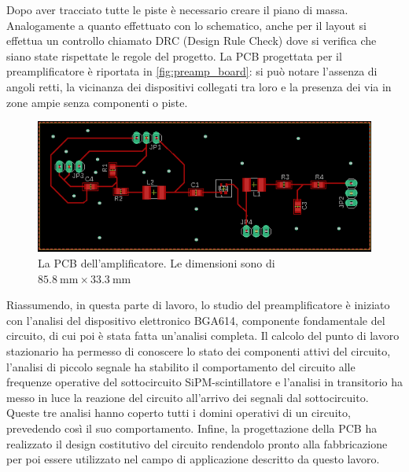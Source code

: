 Dopo aver tracciato tutte le piste è necessario creare il piano di massa. Analogamente a quanto effettuato con lo schematico, anche per il layout
si effettua un controllo chiamato DRC (Design Rule Check) dove si verifica che siano state rispettate le regole del progetto. 
La PCB progettata per il preamplificatore è riportata in \autoref*{fig:preamp_board}: si può notare l'assenza di angoli retti, la vicinanza dei dispositivi collegati
tra loro e la presenza dei via in zone ampie senza componenti o piste.
\begin{figure}[h!]
    \centering
    \includegraphics[width=.65\linewidth]{img/preamp_board.png}
    \caption{La PCB dell'amplificatore. Le dimensioni sono di $\SI{85.8}{\milli\meter} \times \SI{33.3}{\milli\meter}$}
    \label{fig:preamp_board}
\end{figure}

Riassumendo, in questa parte di lavoro, lo studio del preamplificatore è iniziato con l'analisi del dispositivo elettronico BGA614, componente fondamentale del circuito, di cui poi 
è stata fatta un'analisi completa. Il calcolo del punto di lavoro stazionario ha permesso di conoscere lo stato dei componenti attivi del circuito,
l'analisi di piccolo segnale ha stabilito il comportamento del circuito alle frequenze operative del sottocircuito SiPM-scintillatore e l'analisi 
in transitorio ha messo in luce la reazione del circuito all'arrivo dei segnali dal sottocircuito. Queste tre analisi hanno coperto tutti i domini
operativi di un circuito, prevedendo così il suo comportamento. Infine, la progettazione della PCB ha realizzato il design costitutivo del circuito
rendendolo pronto alla fabbricazione per poi essere utilizzato nel campo di applicazione descritto da questo lavoro.